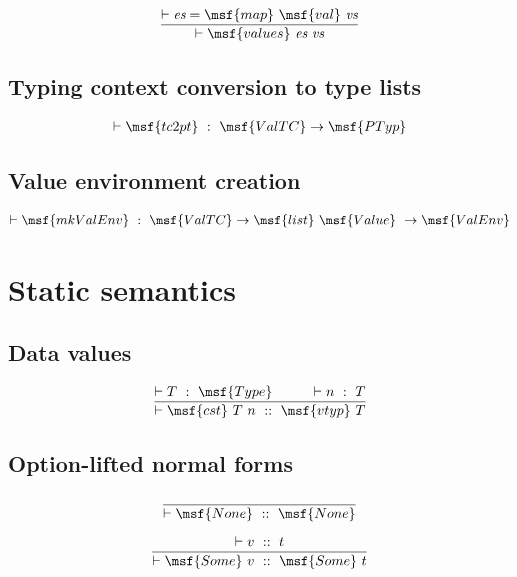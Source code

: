 \documentclass{article}
\begin{document}
\begin{gather}
\frac{ \vdash \mbox{\it es} = \msf{map} \ \msf{val} \ \mbox{\it vs} }  
{\vdash \msf{values} \ \mbox{\it es} \ \mbox{\it vs}}
\end{gather}


\subsection{Typing context conversion to type lists}

\begin{gather}
\vdash \msf{tc2pt} \ : \ \msf{ValTC} \to \msf{PTyp} 
\end{gather}



\subsection{Value environment creation}

\begin{gather}
\vdash \msf{mkValEnv} \ : \ \msf{ValTC} \to \msf{list} \ \msf{Value} \ \to
 \msf{ValEnv}
\end{gather}



\section{Static semantics}


\subsection{Data values}

\begin{gather}
\frac{ \vdash T \ : \ \msf{Type} \ \qquad \ \vdash n \ : \ T}
 { \vdash \msf{cst} \ T \ n \ :: \ \msf{vtyp} \ T }
\end{gather}



\subsection{Option-lifted normal forms}

\begin{gather}
\frac{ }
 { \vdash \msf{None} \ :: \ \msf{None} }
\end{gather}


\begin{gather}
\frac{ \vdash v \ :: \ t}
 { \vdash \msf{Some} \ v \ :: \ \msf{Some} \ t }
\end{gather}
\end{document}
